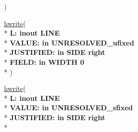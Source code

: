\begin{DoxyCompactItemize}
   )
\item 
{\bfseries {\bfseries \textcolor{vhdlchar}{ }}} \hyperlink{class__fixed__pkg_ab1001685e3bc671509d9604b49c93ad3}{hwrite}( \\*
{\bfseries \textcolor{vhdlchar}{ }\textcolor{vhdlchar}{L\+: }\textcolor{stringliteral}{} {\bfseries \textcolor{keywordflow}{inout}\textcolor{vhdlchar}{ }\textcolor{vhdlchar}{L\+I\+N\+E}\textcolor{vhdlchar}{ }}}\\*
  {\bfseries \textcolor{vhdlchar}{ }\textcolor{vhdlchar}{V\+A\+L\+U\+E\+: }\textcolor{stringliteral}{} {\bfseries \textcolor{keywordflow}{in}\textcolor{vhdlchar}{ }\textcolor{vhdlchar}{U\+N\+R\+E\+S\+O\+L\+V\+E\+D\+\_\+ufixed}\textcolor{vhdlchar}{ }}}\\*
  {\bfseries \textcolor{vhdlchar}{ }\textcolor{vhdlchar}{J\+U\+S\+T\+I\+F\+I\+E\+D\+: }\textcolor{stringliteral}{} {\bfseries \textcolor{keywordflow}{in}\textcolor{vhdlchar}{ }\textcolor{vhdlchar}{S\+I\+D\+E}\textcolor{vhdlchar}{ }\textcolor{vhdlchar}{ }\textcolor{vhdlchar}{ }\textcolor{vhdlchar}{ }\textcolor{vhdlchar}{ }\textcolor{vhdlkeyword}{right}\textcolor{vhdlchar}{ }}}\\*
  {\bfseries \textcolor{vhdlchar}{ }\textcolor{vhdlchar}{F\+I\+E\+L\+D\+: }\textcolor{stringliteral}{} {\bfseries \textcolor{keywordflow}{in}\textcolor{vhdlchar}{ }\textcolor{vhdlchar}{W\+I\+D\+T\+H}\textcolor{vhdlchar}{ }\textcolor{vhdlchar}{ }\textcolor{vhdlchar}{ } \textcolor{vhdldigit}{0} \textcolor{vhdlchar}{ }}}\\*
   )
\item 
{\bfseries {\bfseries \textcolor{vhdlchar}{ }}} \hyperlink{class__fixed__pkg_ab1001685e3bc671509d9604b49c93ad3}{hwrite}( \\*
{\bfseries \textcolor{vhdlchar}{ }\textcolor{vhdlchar}{L\+: }\textcolor{stringliteral}{} {\bfseries \textcolor{keywordflow}{inout}\textcolor{vhdlchar}{ }\textcolor{vhdlchar}{L\+I\+N\+E}\textcolor{vhdlchar}{ }}}\\*
  {\bfseries \textcolor{vhdlchar}{ }\textcolor{vhdlchar}{V\+A\+L\+U\+E\+: }\textcolor{stringliteral}{} {\bfseries \textcolor{keywordflow}{in}\textcolor{vhdlchar}{ }\textcolor{vhdlchar}{U\+N\+R\+E\+S\+O\+L\+V\+E\+D\+\_\+sfixed}\textcolor{vhdlchar}{ }}}\\*
  {\bfseries \textcolor{vhdlchar}{ }\textcolor{vhdlchar}{J\+U\+S\+T\+I\+F\+I\+E\+D\+: }\textcolor{stringliteral}{} {\bfseries \textcolor{keywordflow}{in}\textcolor{vhdlchar}{ }\textcolor{vhdlchar}{S\+I\+D\+E}\textcolor{vhdlchar}{ }\textcolor{vhdlchar}{ }\textcolor{vhdlchar}{ }\textcolor{vhdlchar}{ }\textcolor{vhdlchar}{ }\textcolor{vhdlkeyword}{right}\textcolor{vhdlchar}{ }}}\\*

\end{DoxyCompactItemize}
